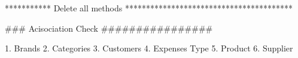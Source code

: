 *********** Delete all methods ****************************************

### Acisociation Check ################


1. Brands
2. Categories
3. Customers
4. Expenses Type
5. Product
6. Supplier